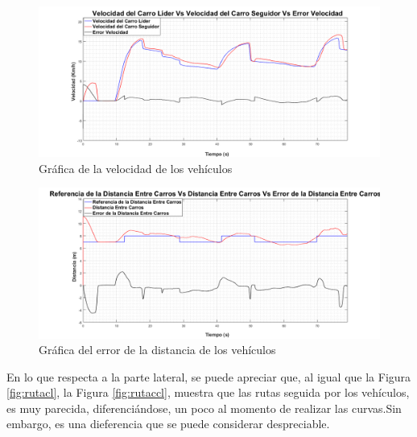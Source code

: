 \begin{figure}[H]
	\centering
		\includegraphics[scale=0.35]{Imagenes/veacl}
		\caption{Gráfica de la velocidad de los vehículos}
		\label{fig:veacl}
\end{figure}	

\begin{figure}[H]
	\centering
		\includegraphics[scale=0.35]{Imagenes/diacl}
		\caption{Gráfica del error de la distancia de los vehículos}
		\label{fig:diacl}
\end{figure}	

\par En lo que respecta a la parte lateral, se puede apreciar que, al igual que la Figura \ref{fig:rutacl}, la Figura \ref{fig:rutaccl}, muestra que las rutas seguida por los vehículos, es muy parecida, diferenciándose, un poco al momento de realizar las curvas.Sin embargo, es una dieferencia que se puede considerar despreciable.\\ 

